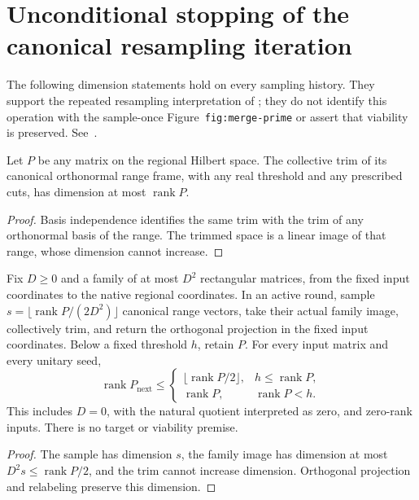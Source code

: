 \section{Unconditional stopping of the canonical resampling iteration}

The following dimension statements hold on every sampling history. They
support the repeated resampling interpretation of
\cite[lines 749--755]{Arad2016RigorousRG}; they do not identify this
operation with the sample-once Figure~\texttt{fig:merge-prime} or assert
that viability is preserved. See~\cite{gap:alvv16_bootstrap_constants}.

\begin{lemma}
    \label{lem:canonical_range_trim_dimension}
    \leanok
    Let $P$ be any matrix on the regional Hilbert space. The collective
    trim of its canonical orthonormal range frame, with any real threshold
    and any prescribed cuts, has dimension at most $\operatorname{rank}P$.
\end{lemma}
\begin{proof}\leanok
    Basis independence identifies the same trim with the trim of any
    orthonormal basis of the range. The trimmed space is a linear image
    of that range, whose dimension cannot increase.
\end{proof}

\begin{lemma}
    \label{lem:canonical_half_sampling_rank_step}
    \leanok
    Fix $D\ge0$ and a family of at most $D^2$ rectangular matrices,
    from the fixed input coordinates to the native regional coordinates.
    In an active round, sample
    $s=\lfloor\operatorname{rank}P/(2D^2)\rfloor$ canonical range vectors,
    take their actual family image, collectively trim, and return the
    orthogonal projection in the fixed input coordinates. Below a fixed
    threshold $h$, retain $P$. For every input matrix and every unitary seed,
    \[
        \operatorname{rank}P_{\mathrm{next}}\le
        \begin{cases}
            \lfloor\operatorname{rank}P/2\rfloor, & h\le\operatorname{rank}P, \\
            \operatorname{rank}P,                 & \operatorname{rank}P<h.
        \end{cases}
    \]
    This includes $D=0$, with the natural quotient interpreted as zero,
    and zero-rank inputs. There is no target or viability premise.
\end{lemma}
\begin{proof}\leanok
    The sample has dimension $s$, the family image has dimension at most
    $D^2s\le\operatorname{rank}P/2$, and the trim cannot increase dimension.
    Orthogonal projection and relabeling preserve this dimension.
\end{proof}

